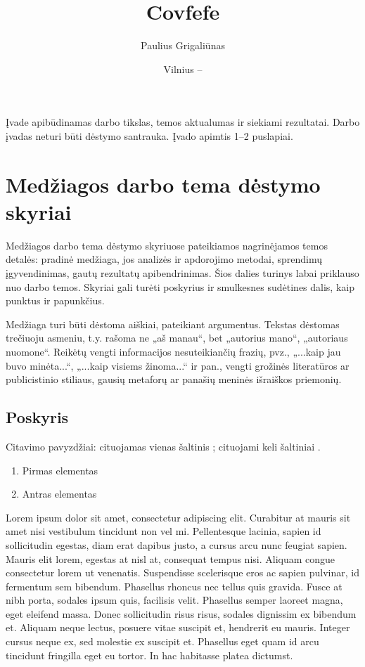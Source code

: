 \documentclass{VUMIFPSkursinis}
\title{Covfefe}
\author{Paulius Grigaliūnas}
\date{Vilnius – \the\year}
\begin{document}
	
\maketitle
\cleardoublepage{}
\setcounter{page}{2}

\tableofcontents

Įvade apibūdinamas darbo tikslas, temos aktualumas ir siekiami rezultatai.
Darbo įvadas neturi būti dėstymo santrauka. Įvado apimtis 1–2 puslapiai.

\section{Medžiagos darbo tema dėstymo skyriai}
Medžiagos darbo tema dėstymo skyriuose pateikiamos nagrinėjamos temos detalės:
pradinė medžiaga, jos analizės ir apdorojimo metodai, sprendimų įgyvendinimas,
gautų rezultatų apibendrinimas. Šios dalies turinys labai priklauso nuo darbo
temos. Skyriai gali turėti poskyrius ir smulkesnes sudėtines dalis, kaip
punktus ir papunkčius.

Medžiaga turi būti dėstoma aiškiai, pateikiant argumentus. Tekstas dėstomas
trečiuoju asmeniu, t.y. rašoma ne „aš manau“, bet „autorius mano“, „autoriaus
nuomone“. Reikėtų vengti informacijos nesuteikiančių frazių, pvz., „...kaip jau
buvo minėta...“, „...kaip visiems žinoma...“ ir pan., vengti grožinės literatūros
ar publicistinio stiliaus, gausių metaforų ar panašių meninės išraiškos
priemonių.

\subsection{Poskyris}
Citavimo pavyzdžiai: cituojamas vienas šaltinis \cite{PvzStraipsnLt}; cituojami
keli šaltiniai \cite{PvzStraipsnEn, PvzKonfLt, PvzKonfEn, PvzKnygLt, PvzKnygEn,
PvzElPubLt, PvzElPubEn, PvzMagistrLt, PvzPhdEn}.

\begin{enumerate}
	\item Pirmas elementas
	\item Antras elementas
\end{enumerate}

Lorem ipsum dolor sit amet, consectetur adipiscing elit. Curabitur at mauris sit amet nisi vestibulum tincidunt non vel mi. Pellentesque lacinia, sapien id sollicitudin egestas, diam erat dapibus justo, a cursus arcu nunc feugiat sapien. Mauris elit lorem, egestas at nisl at, consequat tempus nisi. Aliquam congue consectetur lorem ut venenatis. Suspendisse scelerisque eros ac sapien pulvinar, id fermentum sem bibendum. Phasellus rhoncus nec tellus quis gravida. Fusce at nibh porta, sodales ipsum quis, facilisis velit. Phasellus semper laoreet magna, eget eleifend massa. Donec sollicitudin risus risus, sodales dignissim ex bibendum et. Aliquam neque lectus, posuere vitae suscipit et, hendrerit eu mauris. Integer cursus neque ex, sed molestie ex suscipit et. Phasellus eget quam id arcu tincidunt fringilla eget eu tortor. In hac habitasse platea dictumst.
\end{document}
